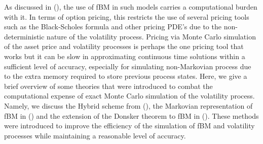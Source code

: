 \documentclass[12pt,oneside]{article}
\begin{document}
As discussed in (\cite{OUMGARI}),  the use of fBM in such models carries a computational burden with it. In terms of option pricing, this restricts the use of several pricing tools such as the Black-Scholes formula and other pricing PDE's due to the non-deterministic nature of the volatility process.  Pricing via Monte Carlo simulation of the asset price and volatility processes is perhaps the one pricing tool that works but it can be slow in approximating continuous time solutions within a sufficient level of accuracy, especially for simulating non-Markovian process due to the extra memory required to store previous process states. Here, we give a brief overview of some theories that were introduced to combat the computational expense of exact Monte Carlo simulation of the volatility process. Namely, we discuss the Hybrid scheme from (\cite{BENNEDSON}), the Markovian representation of fBM in (\cite{HARMS}) and the extension of the Donsker theorem to fBM in (\cite{MUGURUZA}). These methods were introduced to improve the efficiency of the simulation of fBM and volatility processes while maintaining a reasonable level of accuracy.
\end{document}

